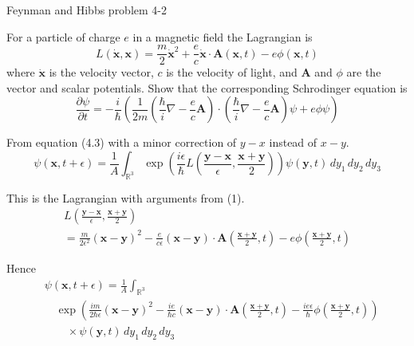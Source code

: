 \documentclass[12pt]{article}
\newcommand\INT{\int_{\mathbb R^3}}
\begin{document}
\begin{center}
Feynman and Hibbs problem 4-2
\end{center}

For a particle of charge $e$ in a magnetic field the Lagrangian is
\begin{equation*}
L(\dot{\mathbf x},\mathbf x)=\frac{m}{2}\dot{\mathbf x}^2
+\frac{e}{c}\dot{\mathbf x}\cdot\mathbf A(\mathbf x,t)-e\phi(\mathbf x,t)
\end{equation*}
where $\dot{\mathbf x}$ is the velocity vector,
$c$ is the velocity of light, and $\mathbf A$ and $\phi$
are the vector and scalar potentials.
Show that the corresponding Schrodinger equation is
\begin{equation*}
\frac{\partial\psi}{\partial t}
=-\frac{i}{\hbar}\left(
\frac{1}{2m}\left(\frac{\hbar}{i}\nabla-\frac{e}{c}\mathbf A\right)
\cdot
\left(\frac{\hbar}{i}\nabla-\frac{e}{c}\mathbf A\right)\psi
+e\phi\psi
\right)
\tag{4.18}
\end{equation*}

From equation (4.3) with a minor correction of $y-x$ instead of $x-y$.
\begin{equation*}
\psi(\mathbf x,t+\epsilon)=\frac{1}{A}\INT\exp\left(
\frac{i\epsilon}{\hbar}L\left(\frac{\mathbf y-\mathbf x}{\epsilon},\frac{\mathbf x+\mathbf y}{2}\right)
\right)\psi(\mathbf y,t)
\,dy_1\,dy_2\,dy_3
\tag{1}
\end{equation*}

This is the Lagrangian with arguments from (1).
\begin{multline*}
L\left(\frac{\mathbf y-\mathbf x}{\epsilon},\frac{\mathbf x+\mathbf y}{2}\right)
\\
=\frac{m}{2\epsilon^2}(\mathbf x-\mathbf y)^2
-\frac{e}{c\epsilon}(\mathbf x-\mathbf y)\cdot\mathbf A\left(\frac{\mathbf x+\mathbf y}{2},t\right)
-e\phi\left(\frac{\mathbf x+\mathbf y}{2},t\right)
\end{multline*}

Hence
\begin{align*}
&\psi(\mathbf x,t+\epsilon)=\frac{1}{A}\INT
\\
&\quad\exp
\left(
\frac{im}{2\hbar\epsilon}(\mathbf x-\mathbf y)^2
-\frac{ie}{\hbar c}(\mathbf x-\mathbf y)\cdot\mathbf A\left(\frac{\mathbf x+\mathbf y}{2},t\right)
-\frac{ie\epsilon}{\hbar}\phi\left(\frac{\mathbf x+\mathbf y}{2},t\right)
\right)
\\
&\quad\quad{}\times\psi(\mathbf y,t)
\,dy_1\,dy_2\,dy_3
\end{align*}
\end{document}
